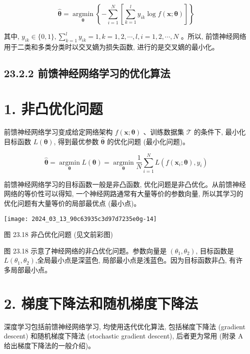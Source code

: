 \documentclass[10pt]{article}
\begin{document}
\begin{CJK*}{UTF8}{bsmi}
\begin{equation*}
\hat{\boldsymbol{\theta}}=\underset{\boldsymbol{\theta}}{\operatorname{argmin}}\left\{-\sum_{i=1}^{N}\left[\sum_{k=1}^{l} y_{i k} \log f(\boldsymbol{x} ; \boldsymbol{\theta})\right]\right\} \tag{23.36}
\end{equation*}


其中, $y_{i k} \in\{0,1\}, \sum_{k=1}^{l} y_{i k}=1, k=1,2, \cdots, l, i=1,2, \cdots, N$ 。所以, 前馈神经网络用于二类和多类分类时以交叉嫡为损失函数, 进行的是交叉嫡的最小化。

\subsection*{23.2.2 前馈神经网络学习的优化算法}
\section*{1. 非凸优化问题}
前馈神经网络学习变成给定网络架构 $f(\boldsymbol{x} ; \boldsymbol{\theta})$ 、训练数据集 $\mathcal{T}$ 的条件下, 最小化目标函数 $L(\boldsymbol{\theta})$, 得到最优参数 $\hat{\boldsymbol{\theta}}$ 的优化问题 (最小化问题)。


\begin{equation*}
\hat{\boldsymbol{\theta}}=\underset{\boldsymbol{\theta}}{\operatorname{argmin}} L(\boldsymbol{\theta})=\underset{\boldsymbol{\theta}}{\operatorname{argmin}} \frac{1}{N} \sum_{i=1}^{N} L\left(f\left(\boldsymbol{x}_{i} ; \boldsymbol{\theta}\right), y_{i}\right) \tag{23.37}
\end{equation*}


前馈神经网络学习的目标函数一般是非凸函数, 优化问题是非凸优化。从前馈神经网络的等价性可以得知, 一个神经网路通常有大量等价的参数向量, 所以其学习的优化问题有大量等价的局部最优点 (最小点)。

\begin{center}
\texttt{[image: 2024\_03\_13\_90c63935c3d97d7235e0g-14]}
\end{center}

图 23.18 非凸优化问题 (见文前彩图)

图 23.18 示意了神经网络的非凸优化问题。参数向量是 $\left(\theta_{1}, \theta_{2}\right)$, 目标函数是 $L\left(\theta_{1}, \theta_{2}\right)$,全局最小点是深蓝色, 局部最小点是浅蓝色。因为目标函数非凸, 有许多局部最小点。

\section*{2. 梯度下降法和随机梯度下降法}
深度学习包括前馈神经网络学习, 均使用迭代优化算法, 包括梯度下降法 (gradient descent) 和随机梯度下降法 (stochastic gradient descent), 后者更为常用 (附录 A 给出梯度下降法的一般介绍)。


\end{CJK*}
\end{document}
